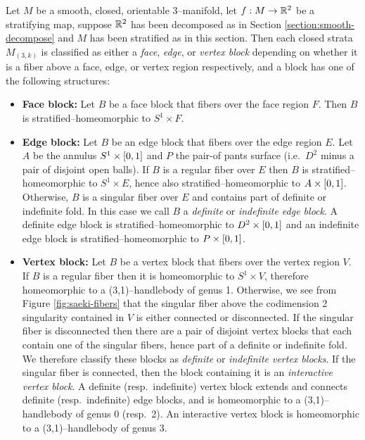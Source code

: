 \begin{theorem}
	\label{thm:block-structure}
	Let $M$ be a smooth, closed, orientable 3--manifold, let $f:M\to\mathbb{R}^2$ be a stratifying map, suppose $\mathbb{R}^2$ has been decomposed as in Section \ref{section:smooth-decompose} and $M$ has been stratified as in this section.
	Then each closed strata $M_{(3,k)}$ is classified as either a \emph{face}, \emph{edge}, or \emph{vertex block} depending on whether it is a fiber above a face, edge, or vertex region respectively, and a block has one of the following structures:
	{\renewcommand\labelitemi{}
		\begin{itemize}
			\item \textbf{Face block:}
			Let $B$ be a face block that fibers over the face region $F$.
			Then $B$ is stratified--homeomorphic to $S^1\times F$.
			
			\item \textbf{Edge block:}
			Let $B$ be an edge block that fibers over the edge region $E$.
			Let $A$ be the annulus $S^1\times[0,1]$ and $P$ the pair-of pants surface (i.e.\ $D^2$ minus a pair of disjoint open balls).
			If $B$ is a regular fiber over $E$ then $B$ is stratified--homeomorphic to $S^1\times E$, hence also stratified--homeomorphic to $A\times[0,1]$.
			Otherwise, $B$ is a singular fiber over $E$ and contains part of definite or indefinite fold.
			In this case we call $B$ a \emph{definite} or \emph{indefinite edge block}.
			A definite edge block is stratified--homeomorphic to $D^2\times[0,1]$ and an indefinite edge block is stratified--homeomorphic to $P\times[0,1]$.
	
			\item \textbf{Vertex block:}
			Let $B$ be a vertex block that fibers over the vertex region $V$.
			If $B$ is a regular fiber then it is homeomorphic to $S^1\times V$, therefore homeomorphic to a (3,1)--handlebody of genus 1.
			Otherwise, we see from Figure \ref{fig:saeki-fibers} that the singular fiber above the codimension 2 singularity contained in $V$ is either connected or disconnected.
			If the singular fiber is disconnected then there are a pair of disjoint vertex blocks that each contain one of the singular fibers, hence part of a definite or indefinite fold.
			We therefore classify these blocks as \emph{definite} or \emph{indefinite vertex blocks}.
			If the singular fiber is connected, then the block containing it is an \emph{interactive vertex block}.
			A definite (resp.\ indefinite) vertex block extends and connects definite (resp.\ indefinite) edge blocks, and is homeomorphic to a (3,1)--handlebody of genus 0 (resp.\ 2).
			An interactive vertex block is homeomorphic to a (3,1)--handlebody of genus 3.
		\end{itemize}
	}
\end{theorem}

